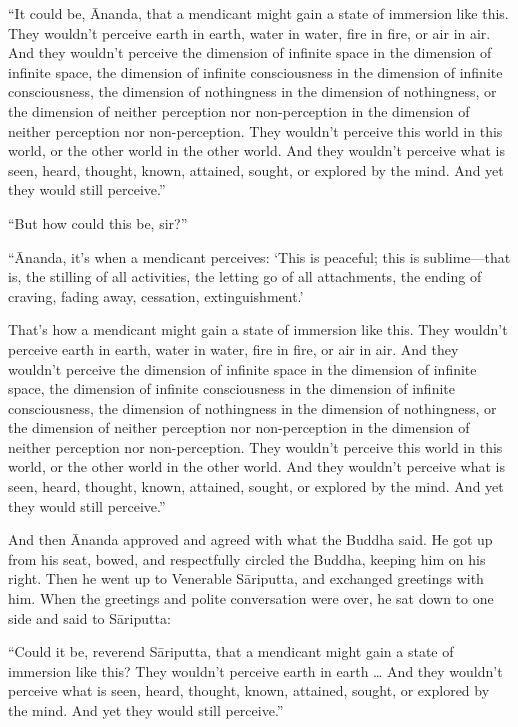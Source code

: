\documentclass[12pt,openany]{book}%
\begin{document}
“It could be, Ānanda, that a mendicant might gain a state of immersion like this. They wouldn’t perceive earth in earth, water in water, fire in fire, or air in air. And they wouldn’t perceive the dimension of infinite space in the dimension of infinite space, the dimension of infinite consciousness in the dimension of infinite consciousness, the dimension of nothingness in the dimension of nothingness, or the dimension of neither perception nor non-perception in the dimension of neither perception nor non-perception. They wouldn’t perceive this world in this world, or the other world in the other world. And they wouldn’t perceive what is seen, heard, thought, known, attained, sought, or explored by the mind. And yet they would still perceive.” 

“But how could this be, sir?” 

“Ānanda, it’s when a mendicant perceives: ‘This is peaceful; this is sublime—that is, the stilling of all activities, the letting go of all attachments, the ending of craving, fading away, cessation, extinguishment.’ 

That’s how a mendicant might gain a state of immersion like this. They wouldn’t perceive earth in earth, water in water, fire in fire, or air in air. And they wouldn’t perceive the dimension of infinite space in the dimension of infinite space, the dimension of infinite consciousness in the dimension of infinite consciousness, the dimension of nothingness in the dimension of nothingness, or the dimension of neither perception nor non-perception in the dimension of neither perception nor non-perception. They wouldn’t perceive this world in this world, or the other world in the other world. And they wouldn’t perceive what is seen, heard, thought, known, attained, sought, or explored by the mind. And yet they would still perceive.” 

And then Ānanda approved and agreed with what the Buddha said. He got up from his seat, bowed, and respectfully circled the Buddha, keeping him on his right. Then he went up to Venerable \textsanskrit{Sāriputta}, and exchanged greetings with him. When the greetings and polite conversation were over, he sat down to one side and said to \textsanskrit{Sāriputta}: 

“Could it be, reverend \textsanskrit{Sāriputta}, that a mendicant might gain a state of immersion like this? They wouldn’t perceive earth in earth … And they wouldn’t perceive what is seen, heard, thought, known, attained, sought, or explored by the mind. And yet they would still perceive.” 
\end{document}
